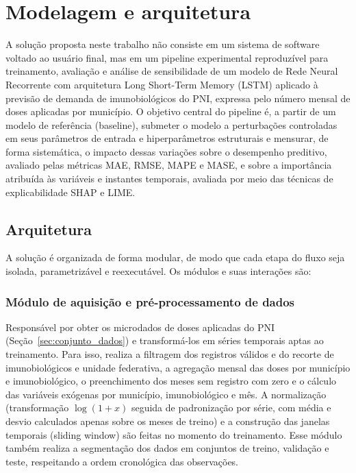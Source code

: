 \documentclass[
    12pt,
    openright,
    oneside,
    a4paper,
    english,
    brazil
]{abntex2}
\begin{document}
\section{Modelagem e arquitetura}
\label{sec:solucao}

A solução proposta neste trabalho não consiste em um sistema de software voltado ao usuário final, mas em um pipeline experimental reproduzível para treinamento, avaliação e análise de sensibilidade de um modelo de Rede Neural Recorrente com arquitetura Long Short-Term Memory (LSTM) aplicado à previsão de demanda de imunobiológicos do PNI, expressa pelo número mensal de doses aplicadas por município. O objetivo central do pipeline é, a partir de um modelo de referência (baseline), submeter o modelo a perturbações controladas em seus parâmetros de entrada e hiperparâmetros estruturais e mensurar, de forma sistemática, o impacto dessas variações sobre o desempenho preditivo, avaliado pelas métricas MAE, RMSE, MAPE e MASE, e sobre a importância atribuída às variáveis e instantes temporais, avaliada por meio das técnicas de explicabilidade SHAP e LIME.

\subsection{Arquitetura}
\label{subsec:arquitetura}

A solução é organizada de forma modular, de modo que cada etapa do fluxo seja isolada, parametrizável e reexecutável. Os módulos e suas interações são:

\subsubsection{Módulo de aquisição e pré-processamento de dados}

Responsável por obter os microdados de doses aplicadas do PNI (Seção~\ref{sec:conjunto_dados}) e transformá-los em séries temporais aptas ao treinamento. Para isso, realiza a filtragem dos registros válidos e do recorte de imunobiológicos e unidade federativa, a agregação mensal das doses por município e imunobiológico, o preenchimento dos meses sem registro com zero e o cálculo das variáveis exógenas por município, imunobiológico e mês. A normalização (transformação $\log(1+x)$ seguida de padronização por série, com média e desvio calculados apenas sobre os meses de treino) e a construção das janelas temporais (sliding window) são feitas no momento do treinamento. Esse módulo também realiza a segmentação dos dados em conjuntos de treino, validação e teste, respeitando a ordem cronológica das observações.
\end{document}
